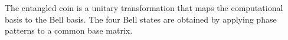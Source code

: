 The entangled coin is a unitary transformation that maps the
computational basis to the Bell basis. The four Bell states are
obtained by applying phase patterns to a common base matrix.

